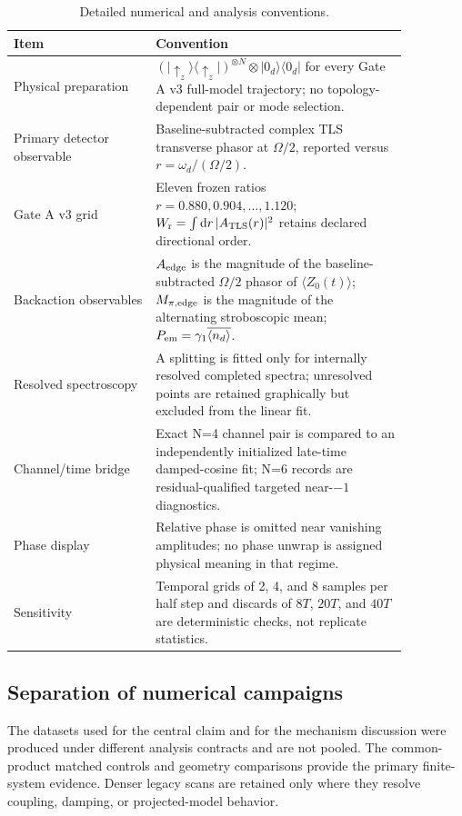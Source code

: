 \documentclass[11pt]{article}
\newcommand{\Wraw}{W_{\mathrm r}}
\newcommand{\dd}{\mathrm{d}}
\newcommand{\ket}[1]{\lvert #1\rangle}
\newcommand{\bra}[1]{\langle #1\rvert}
\newcommand{\expect}[1]{\langle #1\rangle}
\begin{document}
\begin{table}[ht]
\centering
\caption{Detailed numerical and analysis conventions.}
\label{tab:supp-protocol}
\small
\begin{tabular}{>{\raggedright\arraybackslash}p{0.31\linewidth}>{\raggedright\arraybackslash}p{0.55\linewidth}}
\toprule
Item & Convention \\
\midrule
Physical preparation & $\left(\ket{\uparrow_z}\bra{\uparrow_z}\right)^{\otimes N}\otimes\ket{0_d}\bra{0_d}$ for every Gate A v3 full-model trajectory; no topology-dependent pair or mode selection. \\
Primary detector observable & Baseline-subtracted complex TLS transverse phasor at $\Omega/2$, reported versus $r=\omega_d/(\Omega/2)$. \\
Gate A v3 grid & Eleven frozen ratios $r=0.880,0.904,\ldots,1.120$; $\Wraw=\int\dd r\,|A_{\rm TLS}(r)|^2$ retains declared directional order. \\
Backaction observables & $A_{\rm edge}$ is the magnitude of the baseline-subtracted $\Omega/2$ phasor of $\expect{Z_0(t)}$; $M_{\pi,{\rm edge}}$ is the magnitude of the alternating stroboscopic mean; $P_{\rm em}=\gamma_1\overline{\expect{n_d}}$. \\
Resolved spectroscopy & A splitting is fitted only for internally resolved completed spectra; unresolved points are retained graphically but excluded from the linear fit. \\
Channel/time bridge & Exact N=4 channel pair is compared to an independently initialized late-time damped-cosine fit; N=6 records are residual-qualified targeted near-$-1$ diagnostics. \\
Phase display & Relative phase is omitted near vanishing amplitudes; no phase unwrap is assigned physical meaning in that regime. \\
Sensitivity & Temporal grids of 2, 4, and 8 samples per half step and discards of $8T$, $20T$, and $40T$ are deterministic checks, not replicate statistics. \\
\bottomrule
\end{tabular}
\end{table}

\subsection{Separation of numerical campaigns}

The datasets used for the central claim and for the mechanism discussion were produced under different analysis contracts and are not pooled. The common-product matched controls and geometry comparisons provide the primary finite-system evidence. Denser legacy scans are retained only where they resolve coupling, damping, or projected-model behavior.
\end{document}
